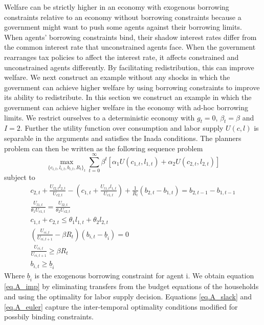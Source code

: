\documentclass[thmsb,11pt]{article}
\begin{document}
Welfare can  be strictly higher in an economy  with exogenous
borrowing constraints  relative to an economy without borrowing constraints because  a government might want to
push some agents against their borrowing limits. When agents' borrowing
constraints bind, their shadow interest rates differ from the
common interest rate that unconstrained agents face. When the government rearranges tax
policies to  affect the  interest rate, it affects constrained and unconstrained agents
 differently.  By facilitating
redistribution, this can improve welfare. %
We next construct an example without any
shocks in which the government can achieve higher welfare by using borrowing
constraints to improve its ability to redistribute.
In this section we construct an example in which the government can achieve
higher welfare in the economy with ad-hoc borrowing limits. We restrict ourselves to a deterministic economy with $g_t=0$, $\beta_t=\beta$ and $I=2$.  Further the utility function over consumption and labor supply $U(c,l)$ is separable in the arguments and satisfies the Inada conditions. The  planners problem can then be written as the following sequence problem
\begin{equation}
	\max_{\{c_{i,t},l_{i,t},b_{i,t},R_t\}_t} \sum_{t=0}^\infty\beta^t\left[\alpha_1U(c_{1,t},l_{1,t}) +\alpha_2 U(c_{2,t},l_{2,t})\right]\label{eq.A_obj}
\end{equation}subject to
\begin{subequations}
\begin{align}
	c_{2,t}+\frac{U_{l2,t}l_{2,t}}{U_{c2,t}}-\left(c_{1,t}+\frac{U_{l1,t}l_{1,t}}{U_{c1,t}}\right) +\frac{1}{R_t}\left( b_{2,t}-b_{1,t}\right)  = b_{2,t-1}-b_{1,t-1}\label{eq.A_imp}\\
	\frac{U_{l1,t}}{\theta_1U_{c1,t}} = \frac{U_{l2,t}}{\theta_2 U_{c2,t}}\label{eq.A_wage}\\
	c_{1,t}+c_{2,t} \leq \theta_1 l_{1,t}+\theta_2 l_{2,t}\label{eq.A_feas}\\
	\left(\frac{U_{ci,t}}{U_{ci,t+1}}-\beta R_t\right)(b_{i,t}-\underline b_i) = 0\label{eq.A_slack}\\
	\frac{U_{ci,t}}{U_{ci,t+1}} \geq \beta R_t\label{eq.A_euler}\\
	b_{i,t}\geq \underline b_i
\end{align}
\end{subequations}  Where $\underline b_i$ is the exogenous borrowing constraint for agent i.  We obtain equation \eqref{eq.A_imp} by eliminating transfers from the budget equations of the households and using the optimality for labor supply decision. Equations \eqref{eq.A_slack} and \eqref{eq.A_euler} capture the inter-temporal optimality conditions modified for possbily binding constraints.
\end{document}
